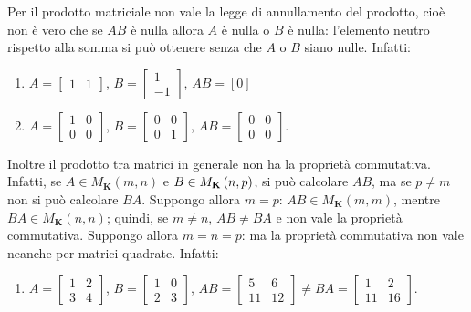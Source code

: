 \documentclass{article}
\begin{document}
\bigskip Per il prodotto matriciale non vale la legge di annullamento del
prodotto, cio\`{e} non \`{e} vero che se $AB$ \`{e} nulla allora $A$ \`{e}
nulla o $B$ \`{e} nulla: l'elemento neutro rispetto alla somma si pu\`{o}
ottenere senza che $A$ o $B$ siano nulle. Infatti:

\begin{enumerate}
\item $A=\left[ 
\begin{array}{cc}
1 & 1%
\end{array}%
\right] $, $B=\left[ 
\begin{array}{c}
1 \\ 
-1%
\end{array}%
\right] $, $AB=\left[ 0\right] $

\item $A=\left[ 
\begin{array}{cc}
1 & 0 \\ 
0 & 0%
\end{array}%
\right] $, $B=\left[ 
\begin{array}{cc}
0 & 0 \\ 
0 & 1%
\end{array}%
\right] $, $AB=\left[ 
\begin{array}{cc}
0 & 0 \\ 
0 & 0%
\end{array}%
\right] $.
\end{enumerate}

Inoltre il prodotto tra matrici in generale non ha la propriet\`{a}
commutativa. Infatti, se $A\in M_{\mathbf{K}}\left( m,n\right) $ e $B\in M_{%
\mathbf{K}}\left( n,p\right) $, si pu\`{o} calcolare $AB$, ma se $p\neq m$
non si pu\`{o} calcolare $BA$. Suppongo allora $m=p$: $AB\in M_{\mathbf{K}%
}\left( m,m\right) $, mentre $BA\in M_{\mathbf{K}}\left( n,n\right) $;
quindi, se $m\neq n$, $AB\neq BA$ e non vale la propriet\`{a} commutativa.
Suppongo allora $m=n=p$: ma la propriet\`{a} commutativa non vale neanche
per matrici quadrate. Infatti:

\begin{enumerate}
\item $A=\left[ 
\begin{array}{cc}
1 & 2 \\ 
3 & 4%
\end{array}%
\right] $, $B=\left[ 
\begin{array}{cc}
1 & 0 \\ 
2 & 3%
\end{array}%
\right] $, $AB=\left[ 
\begin{array}{cc}
5 & 6 \\ 
11 & 12%
\end{array}%
\right] \neq BA=\left[ 
\begin{array}{cc}
1 & 2 \\ 
11 & 16%
\end{array}%
\right] $.
\end{enumerate}
\end{document}
